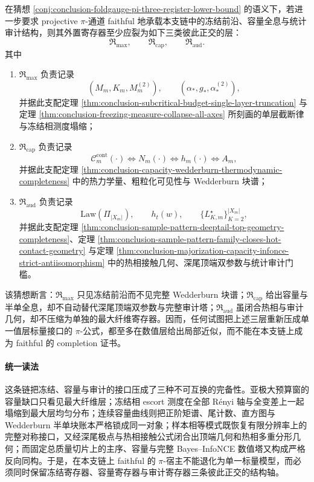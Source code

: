 \begin{conjecture}\label{conj:conclusion-piformula-freezing-capacity-audit-three-register-lower-bound}
在猜想 \ref{conj:conclusion-foldgauge-pi-three-register-lower-bound} 的语义下，若进一步要求 projective \(\pi\)-通道 faithful 地承载本支链中的冻结前沿、容量全息与统计审计结构，则其外置寄存器至少应裂为如下三类彼此正交的层：
\[
\mathfrak R_{\max},
\qquad
\mathfrak R_{\mathrm{cap}},
\qquad
\mathfrak R_{\mathrm{aud}}.
\]
其中
\begin{enumerate}
  \item \(\mathfrak R_{\max}\) 负责记录
  \[
  (M_m,K_m,M_m^{(2)}),
  \qquad
  (\alpha_\ast,g_\ast,\alpha_\ast^{(2)}),
  \]
  并据此支配定理 \ref{thm:conclusion-subcritical-budget-single-layer-truncation} 与定理 \ref{thm:conclusion-freezing-measure-collapse-all-axes} 所刻画的单层截断律与冻结相测度塌缩；
  \item \(\mathfrak R_{\mathrm{cap}}\) 负责记录
  \[
  \mathcal C_m^{\mathrm{cont}}(\cdot)
  \Longleftrightarrow
  N_m(\cdot)
  \Longleftrightarrow
  h_m(\cdot)
  \Longleftrightarrow
  A_m,
  \]
  并据此支配定理 \ref{thm:conclusion-capacity-wedderburn-thermodynamic-completeness} 中的热力学量、粗粒化可见性与 Wedderburn 块谱；
  \item \(\mathfrak R_{\mathrm{aud}}\) 负责记录
  \[
  \mathrm{Law}(\Pi_{|X_m|}),
  \qquad
  h_t(w),
  \qquad
  \{L_{K,m}^\star\}_{K=2}^{|X_m|},
  \]
  并据此支配定理 \ref{thm:conclusion-sample-pattern-deeptail-top-geometry-completeness}、定理 \ref{thm:conclusion-sample-pattern-family-closes-hot-contact-geometry} 与定理 \ref{thm:conclusion-majorization-capacity-infonce-strict-antiisomorphism} 中的热相接触几何、深尾顶端双参数与统计审计门槛。
\end{enumerate}
该猜想断言：\(\mathfrak R_{\max}\) 只见冻结前沿而不见完整 Wedderburn 块谱；\(\mathfrak R_{\mathrm{cap}}\) 给出容量与半单全息，却不自动替代深尾顶端双参数与完整审计塔；\(\mathfrak R_{\mathrm{aud}}\) 虽闭合热相与审计几何，却不压缩为单独的最大纤维寄存器。因而，任何试图把上述三层重新压成单一值层标量接口的 \(\pi\)-公式，都至多在数值层给出局部近似，而不能在本支链上成为 faithful 的 completion 证书。
\end{conjecture}

\paragraph{统一读法}
这条链把冻结、容量与审计的接口压成了三种不可互换的完备性。亚极大预算窗的容量缺口只看见最大纤维层；冻结相 escort 测度在全部 Rényi 轴与全变差上一起塌缩到最大层均匀分布；连续容量曲线则把正阶矩谱、尾计数、直方图与 Wedderburn 半单块账本严格锁成同一对象；样本相等模式既恢复有限分辨率上的完整对称接口，又经深尾极点与热相接触公式闭合出顶端几何和热相多重分形几何；而固定总质量切片上的主序、容量与完整 Bayes--InfoNCE 数值塔又构成严格反向同构。于是，在本支链上 faithful 的 \(\pi\)-宿主不能退化为单一标量模型，而必须同时保留冻结寄存器、容量寄存器与审计寄存器三条彼此正交的结构轴。

\endinput

